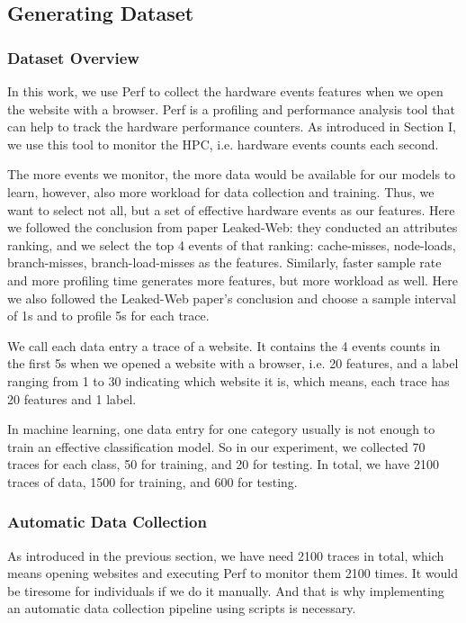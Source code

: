 \documentclass[conference]{IEEEtran}
\begin{document}
\subsection{Generating Dataset}
\subsubsection{Dataset Overview}
In this work, we use Perf\cite{b2} to collect the hardware events features when we open the website with a browser. Perf is a profiling and performance analysis tool that can help to track the hardware performance counters. As introduced in Section I, we use this tool to monitor the HPC, i.e. hardware events counts each second.

The more events we monitor, the more data would be available for our models to learn, however, also more workload for data collection and training. Thus, we want to select not all, but a set of effective hardware events as our features. Here we followed the conclusion from paper Leaked-Web\cite{b1}: they conducted an attributes ranking, and we select the top 4 events of that ranking: cache-misses, node-loads, branch-misses, branch-load-misses as the features. Similarly, faster sample rate and more profiling time generates more features, but more workload as well. Here we also followed the Leaked-Web\cite{b1} paper's conclusion and choose a sample interval of 1s and to profile 5s for each trace.

We call each data entry a trace of a website. It contains the 4 events counts in the first 5s when we opened a website with a browser, i.e. 20 features, and a label ranging from 1 to 30 indicating which website it is, which means, each trace has 20 features and 1 label.

In machine learning, one data entry for one category usually is not enough to train an effective classification model. So in our experiment, we collected 70 traces for each class, 50 for training, and 20 for testing. In total, we have 2100 traces of data, 1500 for training, and 600 for testing.

\subsubsection{Automatic Data Collection}
As introduced in the previous section, we have need 2100 traces in total, which means opening websites and executing Perf to monitor them 2100 times. It would be tiresome for individuals if we do it manually. And that is why implementing an automatic data collection pipeline using scripts is necessary.
\end{document}
